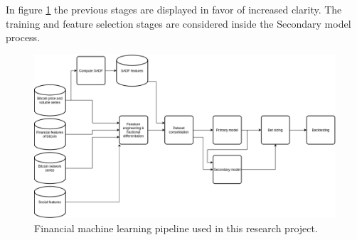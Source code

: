 In figure \ref{fig:pipeline} the previous stages are displayed in favor of
increased clarity. The training and feature selection stages are considered
inside the Secondary model process.

\begin{figure}[H]
    \centering
    \includegraphics[width=\textwidth]{methods/images/pipeline.png}
    \caption{Financial machine learning pipeline used in this research project.}
    \label{fig:pipeline}
\end{figure}